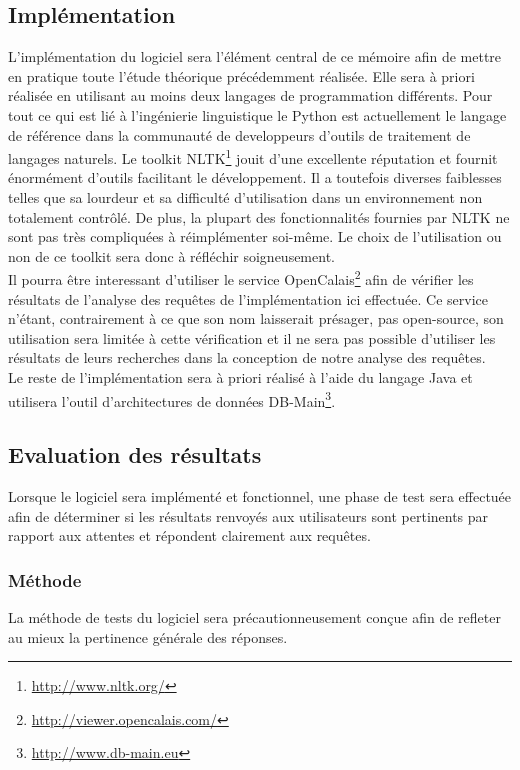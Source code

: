 \documentclass[11pt]{article}
\begin{document}
\subsection{Implémentation}
L'implémentation du logiciel sera l'élément central de ce mémoire afin de mettre en pratique toute l'étude théorique précédemment réalisée.
Elle sera à priori réalisée en utilisant au moins deux langages de programmation différents.
Pour tout ce qui est lié à l'ingénierie linguistique le Python est actuellement le langage de référence dans la communauté de developpeurs d'outils de traitement de langages naturels.
Le toolkit NLTK\footnote{\url{http://www.nltk.org/}} jouit d'une excellente réputation et fournit énormément d'outils facilitant le développement.
Il a toutefois diverses faiblesses telles que sa lourdeur et sa difficulté d'utilisation dans un environnement non totalement contrôlé.
De plus, la plupart des fonctionnalités fournies par NLTK ne sont pas très compliquées à réimplémenter soi-même.
Le choix de l'utilisation ou non de ce toolkit sera donc à réfléchir soigneusement. \\

Il pourra être interessant d'utiliser le service OpenCalais\footnote{\url{http://viewer.opencalais.com/}} afin de vérifier les résultats de l'analyse des requêtes de l'implémentation ici effectuée.
Ce service n'étant, contrairement à ce que son nom laisserait présager, pas open-source, son utilisation sera limitée à cette vérification et il ne sera pas possible d'utiliser les résultats de leurs recherches dans la conception de notre analyse des requêtes. \\

Le reste de l'implémentation sera à priori réalisé à l'aide du langage Java et utilisera l'outil d'architectures de données DB-Main\footnote{\url{http://www.db-main.eu}}.
\subsection{Evaluation des résultats}
Lorsque le logiciel sera implémenté et fonctionnel, une phase de test sera effectuée afin de déterminer si les résultats renvoyés aux utilisateurs sont pertinents par rapport aux attentes et répondent clairement aux requêtes.
\subsubsection{Méthode}
La méthode de tests du logiciel sera précautionneusement conçue afin de refleter au mieux la pertinence générale des réponses. 
\end{document}
